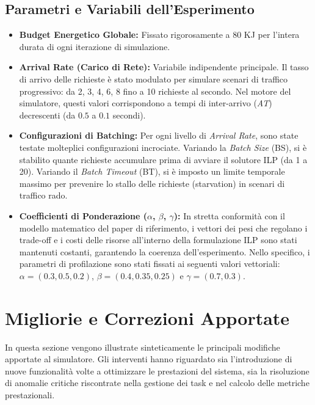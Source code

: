 \documentclass[11pt,a4paper]{article}
\begin{document}
\subsection{Parametri e Variabili dell'Esperimento}
\begin{itemize}
    \item \textbf{Budget Energetico Globale:} Fissato rigorosamente a 80 KJ per l'intera durata di ogni iterazione di simulazione.
    \item \textbf{Arrival Rate (Carico di Rete):} Variabile indipendente principale. Il tasso di arrivo delle richieste è stato modulato per simulare scenari di traffico progressivo: da 2, 3, 4, 6, 8 fino a 10 richieste al secondo. Nel motore del simulatore, questi valori corrispondono a tempi di inter-arrivo (\textit{AT}) decrescenti (da $0.5$ a $0.1$ secondi).
    \item \textbf{Configurazioni di Batching:} Per ogni livello di \textit{Arrival Rate}, sono state testate molteplici configurazioni incrociate. Variando la \textit{Batch Size} (BS), si è stabilito quante richieste accumulare prima di avviare il solutore ILP (da 1 a 20). Variando il \textit{Batch Timeout} (BT), si è imposto un limite temporale massimo per prevenire lo stallo delle richieste (starvation) in scenari di traffico rado.
    \item \textbf{Coefficienti di Ponderazione ($\alpha$, $\beta$, $\gamma$):} In stretta conformità con il modello matematico del paper di riferimento, i vettori dei pesi che regolano i trade-off e i costi delle risorse all'interno della formulazione ILP sono stati mantenuti costanti, garantendo la coerenza dell'esperimento. Nello specifico, i parametri di profilazione sono stati fissati ai seguenti valori vettoriali: $\alpha = (0.3, 0.5, 0.2)$, $\beta = (0.4, 0.35, 0.25)$ e $\gamma = (0.7, 0.3)$.
\end{itemize}


\section{Migliorie e Correzioni Apportate}
In questa sezione vengono illustrate sinteticamente le principali modifiche apportate al simulatore. Gli interventi hanno riguardato sia l'introduzione di nuove funzionalità volte a ottimizzare le prestazioni del sistema, sia la risoluzione di anomalie critiche riscontrate nella gestione dei task e nel calcolo delle metriche prestazionali.
\end{document}
